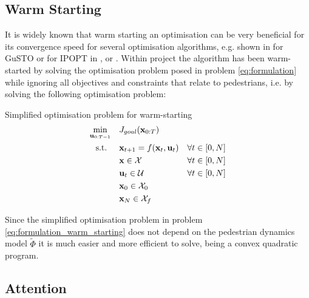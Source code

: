 \subsection{Warm Starting}
\label{text:approach/runtime/warm_starting}
It is widely known that warm starting an optimisation can be very beneficial for its convergence speed for several optimisation algorithms, e.g. shown in \cite{Banerjee2020} for \ac{GuSTO} or for \ac{IPOPT} in \cite{Shahzad2010}, \cite{John2008} or \cite{Spielberge2019}.
\newline
Within project \project the algorithm has been warm-started by solving the optimisation problem posed in problem \ref{eq:formulation} while ignoring all objectives and constraints that relate to pedestrians, i.e. by solving the following optimisation problem: \\

\begin{problem}{Simplified \project optimisation problem for warm-starting}
\begin{align}
\min_{\mathbf{u}_{0:T-1}} \quad & J_{goal}(\mathbf{x}_{0:T}) \\
\textrm{s.t. } \quad & \mathbf{x}_{t+1} = f(\mathbf{x}_t, \mathbf{u}_t) & \forall t \in [0, N] \\
& \mathbf{x} \in \mathcal{X} & \forall t \in [0, N]\\
& \mathbf{u}_t \in \mathcal{U} & \forall t \in [0, N]\\
& \mathbf{x}_0 \in \mathcal{X}_0 \\
& \mathbf{x}_N \in \mathcal{X}_f
\end{align} 
\label{eq:formulation_warm_starting}
\end{problem}

Since the simplified optimisation problem in problem \ref{eq:formulation_warm_starting} does not depend on the pedestrian dynamics model $\tilde{\Phi}$ it is much easier and more efficient to solve, being a convex quadratic program.


\subsection{Attention}
\label{text:approach/runtime/filtering}
